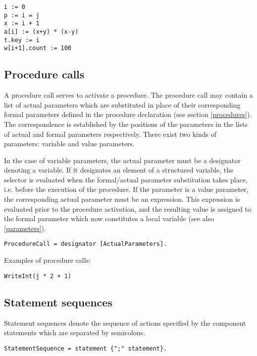 \documentclass[12pt]{article}
\begin{document}
\begin{lstlisting}[style=example]
i := 0
p := i = j
x := i + 1
a[i] := (x+y) * (x-y)
t.key := i
w[i+1].count := 100
\end{lstlisting} 

\subsection{Procedure calls}

A procedure call serves to activate a procedure. The procedure call may contain a list of actual parameters which are substituted in place of their corresponding formal parameters defined in the procedure declaration (see section \ref{procedures}). The correspondence is established by the positions of the parameters in the lists of actual and formal parameters respectively. There exist two kinds of parameters: variable and value parameters.

In the case of variable parameters, the actual parameter must be a designator denoting a variable. If it designates an element of a structured variable, the selector is evaluated when the formal/actual parameter substitution takes place, i.e. before the execution of the procedure. If the parameter is a value parameter, the corresponding actual parameter must be an expression. This expression is evaluated prior to the procedure activation, and the resulting value is assigned to the formal parameter which now constitutes a local variable (see also \ref{parameters}).

\begin{lstlisting}[style=ebnf]
    ProcedureCall = designator [ActualParameters].
\end{lstlisting} 

Examples of procedure calls:

\begin{lstlisting}[style=example]
    WriteInt(j * 2 + 1) 
\end{lstlisting} 

\subsection{Statement sequences}

Statement sequences denote the sequence of actions specified by the component statements which are separated by semicolons.

\begin{lstlisting}[style=ebnf]
    StatementSequence = statement {";" statement}.
\end{lstlisting} 
\end{document}
